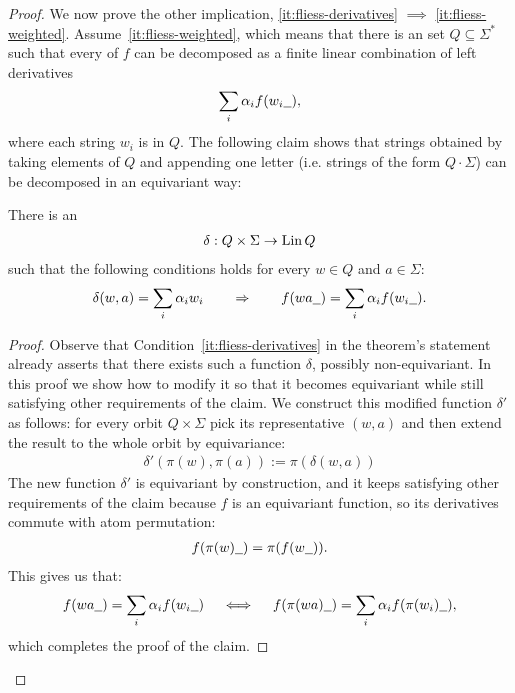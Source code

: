 \begin{proof}
    We now prove the other implication, \ref{it:fliess-derivatives} $\implies$
    \ref{it:fliess-weighted}. Assume~\ref{it:fliess-weighted}, which means that
    there is an  set $Q \subseteq \Sigma^*$ such that every
     of $f$ can be decomposed as a finite linear combination of left
    derivatives
    \begin{align*}
            \sum_i \alpha_i f(w_i\underline{\hspace{2mm}}),
    \end{align*}
    where each string $w_i$ is in $Q$. The following claim shows that strings obtained by taking elements of $Q$ and appending one letter
    (i.e. strings of the form $Q \cdot \Sigma$) can be decomposed in an equivariant way:
    \begin{claim}
      There is an 
        \begin{align*}
       \delta :  Q \times \Sigma \to \operatorname{Lin} Q
        \end{align*}
        such that the following conditions holds for every $w \in Q$ and $a \in \Sigma$:
        \begin{align*}
        \delta(w,a) = 
        \sum_i \alpha_i w_i 
        \qquad \Rightarrow \qquad 
        f(wa\underline{\hspace{2mm}}) = \sum_i \alpha_i f(w_i\underline{\hspace{2mm}}).
        \end{align*}
    \end{claim}
    \begin{proof}
        Observe that Condition~\ref{it:fliess-derivatives} in the theorem's statement already asserts that there exists such a function $\delta$,
        possibly non-equivariant. In this proof we show how to modify it so that it becomes equivariant
        while still satisfying other requirements of the claim. We construct this modified function $\delta'$ as follows:
        for every orbit $Q \times \Sigma$ pick its representative $(w, a)$ and then extend the result to the whole orbit by equivariance:
        \begin{align*}
        \delta'(\pi(w), \pi(a)) := \pi(\delta(w, a))
        \end{align*}
        The new function $\delta'$ is equivariant by construction, and it keeps satisfying other requirements of the claim because
        $f$ is an equivariant function, so its derivatives commute with atom permutation:
        \begin{align*}
        f(\pi(w)\underline{\hspace{2mm}})= \pi(f(w\underline{\hspace{2mm}})).
        \end{align*}
        This gives  us that:
        \begin{align*}
                    f(wa\underline{\hspace{2mm}}) = \sum_i \alpha_i f(w_i\underline{\hspace{2mm}})
                    \quad \iff \quad 
                            f(\pi(wa)\underline{\hspace{2mm}}) = \sum_i \alpha_i f(\pi(w_i)\underline{\hspace{2mm}}),
        \end{align*}
        which completes the proof of the claim.
    \end{proof}        


\end{proof}
